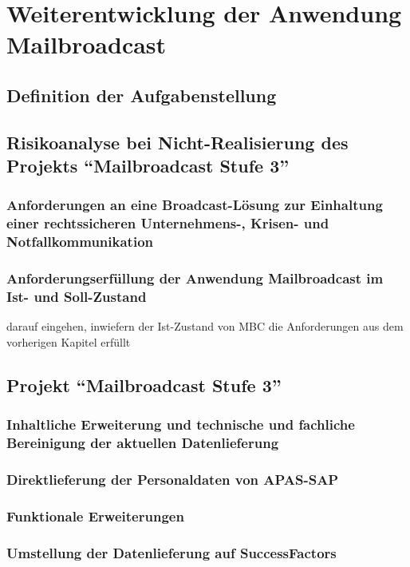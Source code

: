 \section{Weiterentwicklung der Anwendung Mailbroadcast}
\label{sec:praxis}

\subsection{Definition der Aufgabenstellung}

\subsection{Risikoanalyse bei Nicht-Realisierung des Projekts \enquote{Mailbroadcast Stufe 3}}
\subsubsection{Anforderungen an eine Broadcast-Lösung zur Einhaltung einer rechtssicheren Unternehmens-, Krisen- und Notfallkommunikation}
\subsubsection{Anforderungserfüllung der Anwendung Mailbroadcast im Ist- und Soll-Zustand}
darauf eingehen, inwiefern der Ist-Zustand von MBC die Anforderungen aus dem vorherigen Kapitel erfüllt

\subsection{Projekt \enquote{Mailbroadcast Stufe 3}}

\subsubsection{Inhaltliche Erweiterung und technische und fachliche Bereinigung der aktuellen Datenlieferung}
\subsubsection{Direktlieferung der Personaldaten von APAS-SAP} %
\subsubsection{Funktionale Erweiterungen}
\subsubsection{Umstellung der Datenlieferung auf SuccessFactors}
